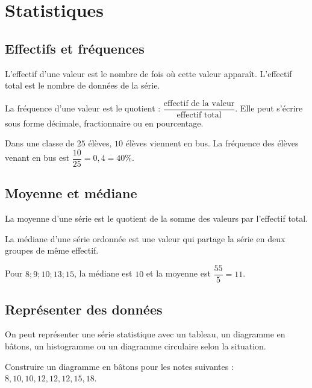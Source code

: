 \documentclass[a4paper,10pt]{report}
\begin{document}
\setcounter{chapter}{13}
\chapter{Statistiques}

\section{Effectifs et fréquences}
\begin{defn}L'effectif d'une valeur est le nombre de fois où cette valeur apparaît. L'effectif total est le nombre de données de la série.\end{defn}
\begin{defn}La fréquence d'une valeur est le quotient : $\dfrac{\text{effectif de la valeur}}{\text{effectif total}}$. Elle peut s'écrire sous forme décimale, fractionnaire ou en pourcentage.\end{defn}
\begin{ex}Dans une classe de $25$ élèves, $10$ élèves viennent en bus. La fréquence des élèves venant en bus est $\dfrac{10}{25}=0,4=40\%$.\end{ex}
\section{Moyenne et médiane}
\begin{defn}La moyenne d'une série est le quotient de la somme des valeurs par l'effectif total.\end{defn}
\begin{defn}La médiane d'une série ordonnée est une valeur qui partage la série en deux groupes de même effectif.\end{defn}
\begin{ex}Pour $8; 9; 10; 13; 15$, la médiane est $10$ et la moyenne est $\dfrac{55}{5}=11$.\end{ex}
\section{Représenter des données}
On peut représenter une série statistique avec un tableau, un diagramme en bâtons, un histogramme ou un diagramme circulaire selon la situation.
\begin{ex}Construire un diagramme en bâtons pour les notes suivantes : $8, 10, 10, 12, 12, 12, 15, 18$.\end{ex}
\end{document}
